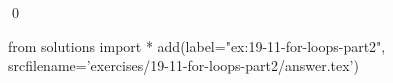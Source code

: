 
\begin{ex}
  \label{ex:19-11-for-loops-part2}
  
  \qed
\end{ex}
\begin{python0}
from solutions import *
add(label="ex:19-11-for-loops-part2",
    srcfilename='exercises/19-11-for-loops-part2/answer.tex')
\end{python0}

